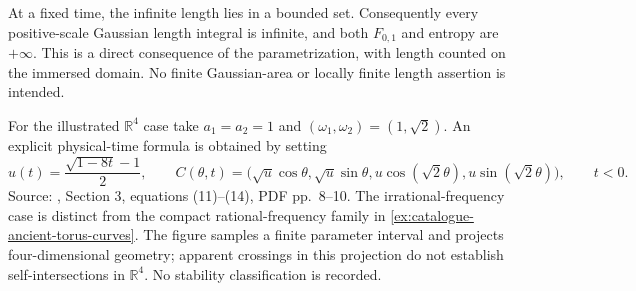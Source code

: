 \begin{example}
At a fixed time, the infinite length lies in a bounded set. Consequently every positive-scale Gaussian length integral is infinite, and both $F_{0,1}$ and entropy are $+\infty$. This is a direct consequence of the parametrization, with length counted on the immersed domain. No finite Gaussian-area or locally finite length assertion is intended.

For the illustrated $\mathbb R^4$ case take $a_1=a_2=1$ and $(\omega_1,\omega_2)=(1,\sqrt2)$. An explicit physical-time formula is obtained by setting
\[
 u(t)=\frac{\sqrt{1-8t}-1}{2},\qquad
 C(\theta,t)=\bigl(\sqrt u\cos\theta,\sqrt u\sin\theta,
 u\cos(\sqrt2\theta),u\sin(\sqrt2\theta)\bigr),\qquad t<0.
\]
Source: \cite{CatAAAW13}, Section 3, equations (11)--(14), PDF pp.~8--10. The irrational-frequency case is distinct from the compact rational-frequency family in \ref{ex:catalogue-ancient-torus-curves}. The figure samples a finite parameter interval and projects four-dimensional geometry; apparent crossings in this projection do not establish self-intersections in $\mathbb R^4$. No stability classification is recorded.
\end{example}

